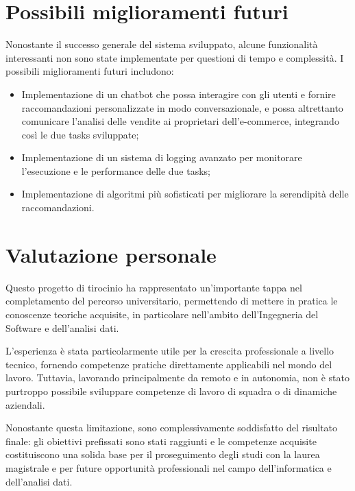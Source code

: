 \section{Possibili miglioramenti futuri}

Nonostante il successo generale del sistema sviluppato, alcune funzionalità interessanti non sono state implementate per questioni di tempo e complessità. I possibili miglioramenti futuri includono:

\begin{itemize}
    \item Implementazione di un chatbot che possa interagire con gli utenti e fornire raccomandazioni personalizzate in modo conversazionale, e possa altrettanto comunicare l'analisi delle vendite ai proprietari dell'e-commerce, integrando così le due tasks sviluppate;
    \item Implementazione di un sistema di logging avanzato per monitorare l'esecuzione e le performance delle due tasks;
    \item Implementazione di algoritmi più sofisticati per migliorare la serendipità delle raccomandazioni.
\end{itemize}

\section{Valutazione personale}

Questo progetto di tirocinio ha rappresentato un'importante tappa nel completamento del percorso universitario, permettendo di mettere in pratica le conoscenze teoriche acquisite, in particolare nell'ambito dell'Ingegneria del Software e dell'analisi dati.

L'esperienza è stata particolarmente utile per la crescita professionale a livello tecnico, fornendo competenze pratiche direttamente applicabili nel mondo del lavoro. Tuttavia, lavorando principalmente da remoto e in autonomia, non è stato purtroppo possibile sviluppare competenze di lavoro di squadra o di dinamiche aziendali.

Nonostante questa limitazione, sono complessivamente soddisfatto del risultato finale: gli obiettivi prefissati sono stati raggiunti e le competenze acquisite costituiscono una solida base per il proseguimento degli studi con la laurea magistrale e per future opportunità professionali nel campo dell'informatica e dell'analisi dati.
